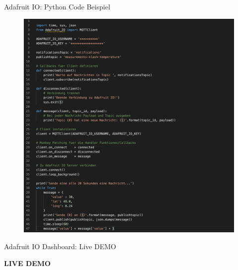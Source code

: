 \begin{frame}{Adafruit IO: Python Code Beispiel}
    \begin{figure}
       \hspace*{2mm}
        \includegraphics[scale=0.28]{7-datenaustausch/img/adafruit-python-mqtt} 
    \end{figure}
 \end{frame}


\begin{frame}{Adafruit IO Dashboard: Live DEMO}
      \centering
  	\begin{Huge}
      		\textbf{LIVE DEMO}
	\end{Huge}
\end{frame}



